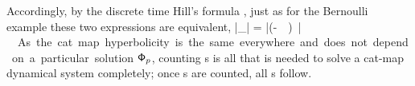 Accordingly, by the discrete time Hill's formula , just as
for the Bernoulli example  these two expressions are
equivalent,
\beq
|\Det\jMorb_\Mm| = |\det(\unit-\jMps_\Mm)|
\,.
As the cat map hyperbolicity is the same everywhere and
does not depend on a particular solution $\mathsf{\Phi}_p$, counting \po s is all
that is needed to solve a cat-map dynamical system completely; once \po s
are counted, all {\cycForm s} follow.
